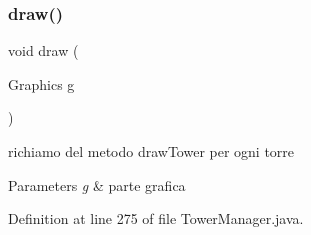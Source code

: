 \subsubsection{\texorpdfstring{draw()}{draw()}}
{\footnotesize\ttfamily void draw (\begin{DoxyParamCaption}\item[{Graphics}]{g }\end{DoxyParamCaption})}



richiamo del metodo draw\+Tower per ogni torre 


\begin{DoxyParams}{Parameters}
{\em g} & parte grafica \\
\hline
\end{DoxyParams}


Definition at line 275 of file Tower\+Manager.\+java.

